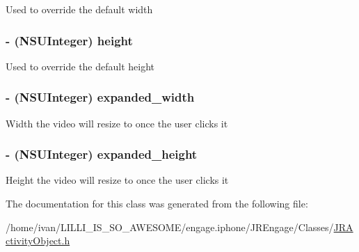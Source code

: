 \label{interface_j_r_flash_media_object_aaeb77e697438b7aa6e44f52bea0ed9c2}
Used to override the default width \hypertarget{interface_j_r_flash_media_object_a0689e19fdf6cb9d3911878a95d6ebcc9}{
\subsubsection[{height}]{\setlength{\rightskip}{0pt plus 5cm}-\/ (NSUInteger) height}}
\label{interface_j_r_flash_media_object_a0689e19fdf6cb9d3911878a95d6ebcc9}
Used to override the default height \hypertarget{interface_j_r_flash_media_object_a9c380d0410afa60d99442f4ab84b517c}{
\subsubsection[{expanded\_\-width}]{\setlength{\rightskip}{0pt plus 5cm}-\/ (NSUInteger) expanded\_\-width}}
\label{interface_j_r_flash_media_object_a9c380d0410afa60d99442f4ab84b517c}
Width the video will resize to once the user clicks it \hypertarget{interface_j_r_flash_media_object_ae390a89405d768f2fcc63c24a8271503}{
\subsubsection[{expanded\_\-height}]{\setlength{\rightskip}{0pt plus 5cm}-\/ (NSUInteger) expanded\_\-height}}
\label{interface_j_r_flash_media_object_ae390a89405d768f2fcc63c24a8271503}
Height the video will resize to once the user clicks it 

The documentation for this class was generated from the following file:\begin{DoxyCompactItemize}
\item 
/home/ivan/LILLI\_\-IS\_\-SO\_\-AWESOME/engage.iphone/JREngage/Classes/\hyperlink{_j_r_activity_object_8h}{JRActivityObject.h}\end{DoxyCompactItemize}
